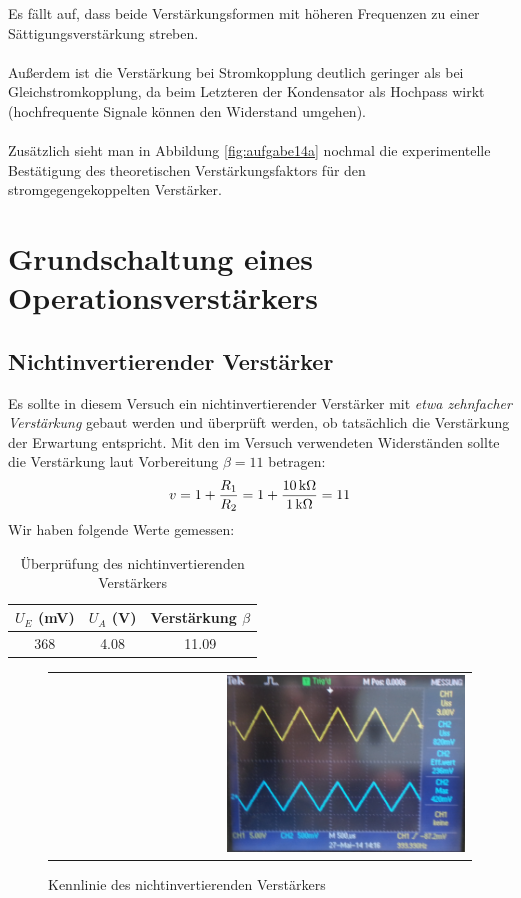 \documentclass[a4paper,titlepage]{scrartcl}
\numberwithin{equation}{section}
\begin{document}
Es fällt auf, dass beide Verstärkungsformen mit höheren Frequenzen zu einer Sättigungsverstärkung streben.\\ \\
Außerdem ist die Verstärkung bei Stromkopplung deutlich geringer als bei Gleichstromkopplung, da beim Letzteren der Kondensator als Hochpass wirkt (hochfrequente Signale können den Widerstand umgehen).\\ \\
Zusätzlich sieht man in Abbildung \ref{fig:aufgabe14a} nochmal die experimentelle Bestätigung des theoretischen Verstärkungsfaktors für den stromgegengekoppelten Verstärker.
\section{Grundschaltung eines Operationsverstärkers}
\subsection{Nichtinvertierender Verstärker}
Es sollte in diesem Versuch ein nichtinvertierender Verstärker mit \emph{etwa zehnfacher Verstärkung} gebaut werden und überprüft werden, ob tatsächlich die Verstärkung der Erwartung entspricht. Mit den im Versuch verwendeten Widerständen sollte die Verstärkung laut Vorbereitung $\beta = 11$ betragen:
\begin{equation*}
v=1+\frac{R_1}{R_2}=1+\frac{\unit[10]{k \Omega}}{\unit[1]{k \Omega}}=11
\end{equation*}
Wir haben folgende Werte gemessen:
\begin{table}[H]
\begin{tabular}{c|c|c}
	$U_E$ (mV) & $U_A$ (V) & Verstärkung $\beta$ \\
	\hline
	368 & 4.08 & 11.09 \\
\end{tabular}
\caption{Überprüfung des nichtinvertierenden Verstärkers}
\label{tab:aufgabe13}
\end{table}
\begin{figure}[H]
	\centering
	\begin{tabular}{@{}r@{}}
		\includegraphics[width=0.58\textwidth]{bilder/aufgabe21.jpg}\\
	\end{tabular}
	\caption{Kennlinie des nichtinvertierenden Verstärkers}
	\label{fig:aufgabe14b}
\end{figure}
\end{document}
